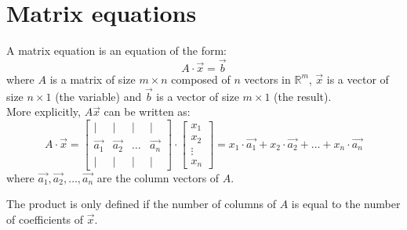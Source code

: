 \section{Matrix equations}
\begin{definition}
    A matrix equation is an equation of the form:
    \[
        A \cdot \vec{x} = \vec{b}
    \]
    where $A$ is a matrix of size $m \times n$ composed of $n$ vectors in $\mathbb{R}^m$, $\vec{x}$ is a vector of size $n \times 1$ (the variable) and $\vec{b}$ is a vector of size $m \times 1$ (the result). \\
    More explicitly, $A \vec{x}$ can be written as:
    \[
        A \cdot \vec{x} = \begin{bmatrix} | & | & | & | \\ \vec{a_1} & \vec{a_2} & \ldots & \vec{a_n} \\ | & | & | & | \end{bmatrix} \cdot \begin{bmatrix} x_1 \\ x_2 \\ \vdots \\ x_n \end{bmatrix} = x_1 \cdot \vec{a_1} + x_2 \cdot \vec{a_2} + \ldots + x_n \cdot \vec{a_n}
    \]
    where $\vec{a_1}, \vec{a_2}, \ldots, \vec{a_n}$ are the column vectors of $A$.
\end{definition}
The product is only defined if the number of columns of $A$ is equal to the number of coefficients of $\vec{x}$.

